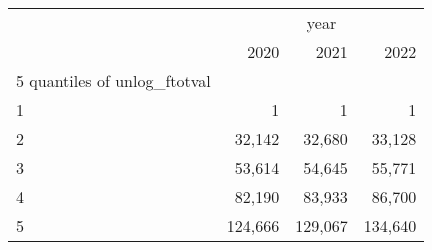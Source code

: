 \begin{tabular}{llll}
\cline{1-4}
\multicolumn{1}{c}{} &
  \multicolumn{3}{|c}{year} \\
\multicolumn{1}{c}{} &
  \multicolumn{1}{|r}{2020} &
  \multicolumn{1}{r}{2021} &
  \multicolumn{1}{r}{2022} \\
\cline{1-4}
\multicolumn{1}{l}{5 quantiles of unlog\_ftotval} &
  \multicolumn{1}{|r}{} &
  \multicolumn{1}{r}{} &
  \multicolumn{1}{r}{} \\
\multicolumn{1}{l}{\hspace{1em}1} &
  \multicolumn{1}{|r}{1} &
  \multicolumn{1}{r}{1} &
  \multicolumn{1}{r}{1} \\
\multicolumn{1}{l}{\hspace{1em}2} &
  \multicolumn{1}{|r}{32,142} &
  \multicolumn{1}{r}{32,680} &
  \multicolumn{1}{r}{33,128} \\
\multicolumn{1}{l}{\hspace{1em}3} &
  \multicolumn{1}{|r}{53,614} &
  \multicolumn{1}{r}{54,645} &
  \multicolumn{1}{r}{55,771} \\
\multicolumn{1}{l}{\hspace{1em}4} &
  \multicolumn{1}{|r}{82,190} &
  \multicolumn{1}{r}{83,933} &
  \multicolumn{1}{r}{86,700} \\
\multicolumn{1}{l}{\hspace{1em}5} &
  \multicolumn{1}{|r}{124,666} &
  \multicolumn{1}{r}{129,067} &
  \multicolumn{1}{r}{134,640} \\
\cline{1-4}
\end{tabular}
